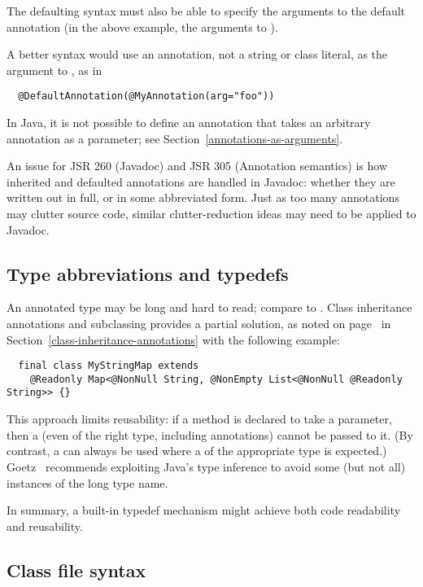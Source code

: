\documentclass[10pt]{article}
\begin{document}
The defaulting syntax must also be able to specify the arguments to the
default annotation (in the above example, the arguments to ).

A better syntax would use an annotation, not a string or class literal, as the
argument to , as in
\begin{Verbatim}
  @DefaultAnnotation(@MyAnnotation(arg="foo"))
\end{Verbatim}
In Java, it is not possible to define an annotation that takes an
arbitrary annotation as a parameter; see
Section~\ref{annotations-as-arguments}.


An issue for JSR 260 (Javadoc) and JSR 305 (Annotation semantics) is how
inherited and defaulted annotations are handled in Javadoc:  whether they
are written out in full, or in some abbreviated form.  Just as too many
annotations may clutter source code, similar clutter-reduction ideas may
need to be applied to Javadoc.


\subsection{Type abbreviations and typedefs\label{typedef}}

An annotated type may be long and hard to read; compare  to .  Class
inheritance annotations and subclassing provides a partial solution, as
noted
on page~\pageref{class-inheritance-annotations}
in Section~\ref{class-inheritance-annotations} with the following example:

\begin{Verbatim}
  final class MyStringMap extends
    @Readonly Map<@NonNull String, @NonEmpty List<@NonNull @Readonly String>> {}
\end{Verbatim}

This approach limits reusability:  if a method is declared to take a
 parameter, then a  (even of the right type,
including annotations) cannot be passed to it.  (By contrast, a
 can always be used where a  of the appropriate
type is expected.)  Goetz~\cite{Goetz2006} recommends exploiting Java's
type inference to avoid some (but not all) instances of the long type name.

In summary, a built-in typedef mechanism might achieve both code
readability and reusability.


\subsection{Class file syntax\label{class-file-syntax}}
\end{document}
